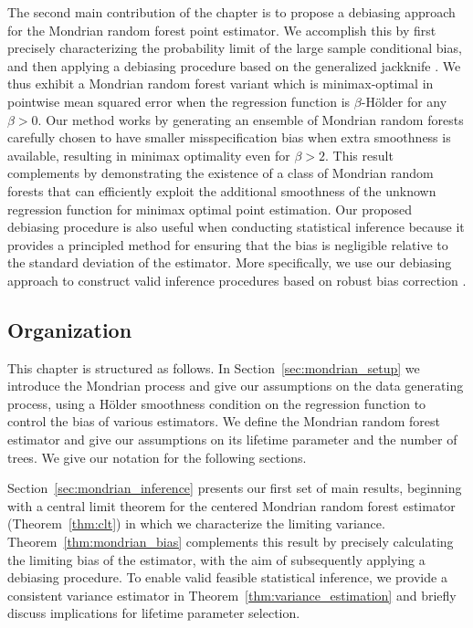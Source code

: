 The second main contribution of the chapter is to propose a debiasing approach
for the Mondrian random forest point estimator. We accomplish this by first
precisely characterizing the probability limit of the large sample conditional
bias, and then applying a debiasing procedure based on the generalized
jackknife \citep{schucany1977improvement}. We thus exhibit a Mondrian random
forest variant which is minimax-optimal in pointwise mean squared error when
the regression function is $\beta$-H{\"o}lder for any $\beta > 0$. Our method
works by generating an ensemble of Mondrian random forests carefully chosen to
have smaller misspecification bias when extra smoothness is available,
resulting in minimax optimality even for $\beta > 2$. This result complements
\citet{mourtada2020minimax} by demonstrating the existence of a class of
Mondrian random forests that can efficiently exploit the additional smoothness
of the unknown regression function for minimax optimal point estimation. Our
proposed debiasing procedure is also useful when conducting statistical
inference because it provides a principled method for ensuring that the bias is
negligible relative to the standard deviation of the estimator. More
specifically, we use our debiasing approach to construct valid inference
procedures based on robust bias correction
\citep{calonico2018jasa,calonico2022bernoulli}.

\subsection{Organization}

This chapter is structured as follows. In Section~\ref{sec:mondrian_setup} we
introduce the Mondrian process and give our assumptions on the data generating
process, using a H{\"o}lder smoothness condition on the regression function to
control the bias of various estimators. We define the Mondrian random forest
estimator and give our assumptions on its lifetime parameter and the number of
trees. We give our notation for the following sections.

Section~\ref{sec:mondrian_inference} presents our first set of main results,
beginning with a central limit theorem for the centered Mondrian random forest
estimator (Theorem~\ref{thm:clt}) in which we characterize the limiting
variance. Theorem~\ref{thm:mondrian_bias} complements this result by precisely
calculating the limiting bias of the estimator, with the aim of subsequently
applying a debiasing procedure. To enable valid feasible statistical inference,
we provide a consistent variance estimator in
Theorem~\ref{thm:variance_estimation} and briefly discuss implications for
lifetime parameter selection.

